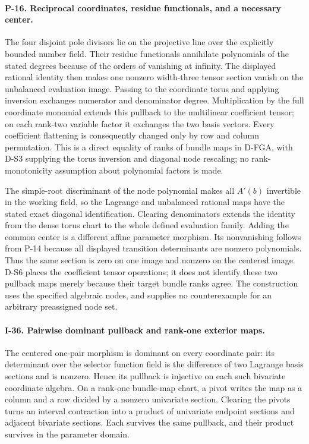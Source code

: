 \paragraph{P-16. Reciprocal coordinates, residue functionals, and a necessary center.}
The four disjoint pole divisors lie on the projective line over
the explicitly bounded number field. Their residue functionals
annihilate polynomials of the stated degrees because of the
orders of vanishing at infinity. The displayed rational identity
then makes one nonzero width-three tensor section vanish on
the unbalanced evaluation image. Passing to the coordinate
torus and applying inversion exchanges numerator and denominator
degree. Multiplication by the full coordinate monomial extends
this pullback to the multilinear coefficient tensor; on each
rank-two variable factor it exchanges the two basis vectors.
Every coefficient flattening is consequently changed only by
row and column permutation. This is a direct equality of ranks
of bundle maps in D-FGA, with D-S3 supplying the torus inversion
and diagonal node rescaling; no rank-monotonicity assumption
about polynomial factors is made.

The simple-root discriminant of the node polynomial makes all
$A'(b)$ invertible in the working field, so the Lagrange and
unbalanced rational maps have the stated exact diagonal
identification. Clearing denominators extends the identity
from the dense torus chart to the whole defined evaluation
family. Adding the common center is a different affine
parameter morphism. Its nonvanishing follows from P-14 because
all displayed transition determinants are nonzero polynomials.
Thus the same section is zero on one image and nonzero on the
centered image. D-S6 places the coefficient tensor operations;
it does not identify these two pullback maps merely because
their target bundle ranks agree. The construction uses the
specified algebraic nodes, and supplies no counterexample
for an arbitrary preassigned node set.


\paragraph{I-36. Pairwise dominant pullback and rank-one exterior maps.}
The centered one-pair morphism is dominant on every coordinate
pair: its determinant over the selector function field is the
difference of two Lagrange basis sections and is nonzero.
Hence its pullback is injective on each such bivariate
coordinate algebra. On a rank-one bundle-map chart, a pivot
writes the map as a column and a row divided by a nonzero
univariate section. Clearing the pivots turns an interval
contraction into a product of univariate endpoint sections
and adjacent bivariate sections. Each survives the same
pullback, and their product survives in the parameter domain.

